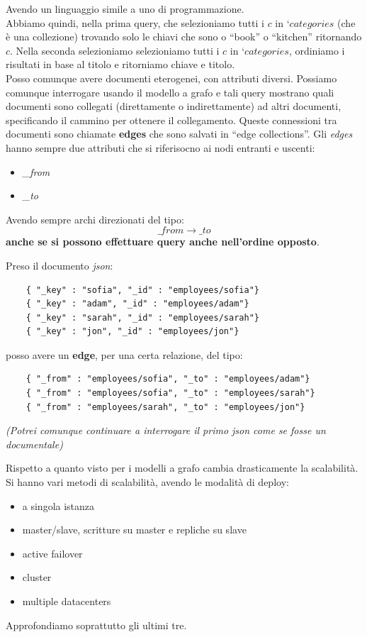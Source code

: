 \documentclass[a4paper,12pt, oneside]{book}
\begin{document}
Avendo un linguaggio simile a uno di programmazione.\\
Abbiamo quindi, nella prima query, che selezioniamo tutti i $c$ in `$categories$
(che è una collezione) trovando solo le chiavi che sono o ``book'' o ``kitchen''
ritornando $c$. Nella seconda selezioniamo selezioniamo tutti i $c$ in
`$categories$, ordiniamo i risultati in base al titolo e ritorniamo chiave e
titolo.\\
Posso comunque avere documenti eterogenei, con attributi diversi. Possiamo
comunque interrogare usando il modello a grafo e tali query mostrano quali
documenti sono collegati (direttamente o indirettamente) ad altri documenti,
specificando il cammino per ottenere il collegamento. Queste connessioni tra
documenti sono chiamate \textbf{edges} che sono salvati in ``edge
collections''. Gli \textit{edges} hanno sempre due attributi che si riferisocno
ai nodi entranti e uscenti:
\begin{itemize}
  \item \textit{\_from}
  \item \textit{\_to}
\end{itemize}
Avendo sempre archi direzionati del tipo:
\[\_from \to \_to\]
\textbf{anche se si possono effettuare query anche nell'ordine opposto}.\\
\begin{esempio}
  Preso il documento \textit{json}:
  \begin{verbatim}
    { "_key" : "sofia", "_id" : "employees/sofia"}
    { "_key" : "adam", "_id" : "employees/adam"}
    { "_key" : "sarah", "_id" : "employees/sarah"}
    { "_key" : "jon", "_id" : "employees/jon"}
  \end{verbatim}
  posso avere un \textbf{edge}, per una certa relazione, del tipo:
  \begin{verbatim}
    { "_from" : "employees/sofia", "_to" : "employees/adam"}
    { "_from" : "employees/sofia", "_to" : "employees/sarah"}
    { "_from" : "employees/sarah", "_to" : "employees/jon"}
  \end{verbatim}
  \textit{(Potrei comunque continuare a interrogare il primo json come se fosse
  un documentale)}
\end{esempio}
Rispetto a quanto visto per i modelli a grafo cambia drasticamente la
scalabilità.\\
Si hanno vari metodi di scalabilità, avendo le modalità di deploy:
\begin{itemize}
  \item a singola istanza
  \item master/slave, scritture su master e repliche su slave
  \item active failover
  \item cluster
  \item multiple datacenters
\end{itemize}
Approfondiamo soprattutto gli ultimi tre.
\end{document}
